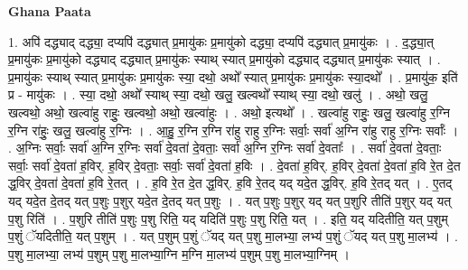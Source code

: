 \documentclass[17pt]{extarticle}
\begin{document}
\textbf{Ghana Paata } \newline

1. अपि॑ दद्ध्याद् दद्ध्या॒ दप्यपि॑ दद्ध्यात् प्र॒मायु॑कः प्र॒मायु॑को दद्ध्या॒ दप्यपि॑ दद्ध्यात् प्र॒मायु॑कः । . द॒द्ध्या॒त् प्र॒मायु॑कः प्र॒मायु॑को दद्ध्याद् दद्ध्यात् प्र॒मायु॑कः स्याथ् स्यात् प्र॒मायु॑को दद्ध्याद् दद्ध्यात् प्र॒मायु॑कः स्यात् । . प्र॒मायु॑कः स्याथ् स्यात् प्र॒मायु॑कः प्र॒मायु॑कः स्या॒ दथो॒ अथो᳚ स्यात् प्र॒मायु॑कः प्र॒मायु॑कः स्या॒दथो᳚ । . प्र॒मायु॑क॒ इति॑ प्र - मायु॑कः । . स्या॒ दथो॒ अथो᳚ स्याथ् स्या॒ दथो॒ खलु॒ खल्वथो᳚ स्याथ् स्या॒ दथो॒ खलु॑ । . अथो॒ खलु॒ खल्वथो॒ अथो॒ खल्वा॑हु राहुः॒ खल्वथो॒ अथो॒ खल्वा॑हुः । . अथो॒ इत्यथो᳚ । . खल्वा॑हु राहुः॒ खलु॒ खल्वा॑हु र॒ग्नि र॒ग्नि रा॑हुः॒ खलु॒ खल्वा॑हु र॒ग्निः । . आ॒हु॒ र॒ग्नि र॒ग्नि रा॑हु राहु र॒ग्निः सर्वाः॒ सर्वा॑ अ॒ग्नि रा॑हु राहु र॒ग्निः सर्वाः᳚ । . अ॒ग्निः सर्वाः॒ सर्वा॑ अ॒ग्नि र॒ग्निः सर्वा॑ दे॒वता॑ दे॒वताः॒ सर्वा॑ अ॒ग्नि र॒ग्निः सर्वा॑ दे॒वताः᳚ । . सर्वा॑ दे॒वता॑ दे॒वताः॒ सर्वाः॒ सर्वा॑ दे॒वता॑ ह॒विर्. ह॒विर् दे॒वताः॒ सर्वाः॒ सर्वा॑ दे॒वता॑ ह॒विः । . दे॒वता॑ ह॒विर्. ह॒विर् दे॒वता॑ दे॒वता॑ ह॒वि रे॒त दे॒त द्ध॒विर् दे॒वता॑ दे॒वता॑ ह॒वि रे॒तत् । . ह॒वि रे॒त दे॒त द्ध॒विर्. ह॒वि रे॒तद् यद् यदे॒त द्ध॒विर्. ह॒वि रे॒तद् यत् । . ए॒तद् यद् यदे॒त दे॒तद् यत् प॒शुः प॒शुर् यदे॒त दे॒तद् यत् प॒शुः । . यत् प॒शुः प॒शुर् यद् यत् प॒शुरि तीति॑ प॒शुर् यद् यत् प॒शु रिति॑ । . प॒शुरि तीति॑ प॒शुः प॒शु रिति॒ यद् यदिति॑ प॒शुः प॒शु रिति॒ यत् । . इति॒ यद् यदितीति॒ यत् प॒शुम् प॒शुं ॅयदितीति॒ यत् प॒शुम् । . यत् प॒शुम् प॒शुं ॅयद् यत् प॒शु मा॒लभ्या॒ लभ्य॑ प॒शुं ॅयद् यत् प॒शु मा॒लभ्य॑ । . प॒शु मा॒लभ्या॒ लभ्य॑ प॒शुम् प॒शु मा॒लभ्या॒ग्नि म॒ग्नि मा॒लभ्य॑ प॒शुम् प॒शु मा॒लभ्या॒ग्निम् । \newline
\end{document}
